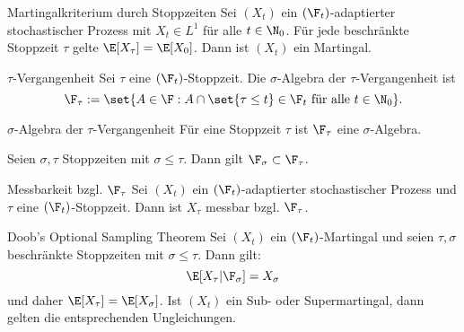 \begin{karte}{Martingalkriterium durch Stoppzeiten}
Sei \((X_t)\) ein \((\F_t)\)-adaptierter stochastischer Prozess mit \(X_t \in L^1\) für 
alle \(t\in \N_0\). Für jede beschränkte Stoppzeit \(\tau\) gelte 
\(\E[X_\tau] = \E[X_0]\). Dann ist \((X_t)\) ein Martingal.
\end{karte}

\begin{karte}{\(\tau\)-Vergangenheit}
Sei \(\tau\) eine \((\F_t)\)-Stoppzeit. Die \(\sigma\)-Algebra der \(\tau\)-Vergangenheit ist 
\[ \F_\tau := \set{ A\in \F: A \cap \set{\tau \leq t} \in \F_t \text{ für alle } t\in \N_0 }. \]
\end{karte}

\begin{karte}{\(\sigma\)-Algebra der \(\tau\)-Vergangenheit}
Für eine Stoppzeit \(\tau\) ist \(\F_\tau\) eine \(\sigma\)-Algebra. 

Seien \(\sigma, \tau\) Stoppzeiten mit \(\sigma \leq \tau\). Dann gilt \(\F_\sigma \subset \F_\tau\).
\end{karte}

\begin{karte}{Messbarkeit bzgl. \(\F_\tau\)}
Sei \((X_t)\) ein \((\F_t)\)-adaptierter stochastischer Prozess und \(\tau\) eine 
\((\F_t)\)-Stoppzeit. Dann ist \(X_\tau\) messbar bzgl. \(\F_\tau\).
\end{karte}

\begin{karte}{Doob's Optional Sampling Theorem}
Sei \((X_t)\) ein \((\F_t)\)-Martingal und seien \(\tau, \sigma\) beschränkte 
Stoppzeiten mit \(\sigma \leq \tau\). Dann gilt: 
\[ \E[X_\tau | \F_\sigma] = X_\sigma \]
und daher \(\E[X_\tau] = \E[X_\sigma]\). Ist \((X_t)\) ein Sub- oder 
Supermartingal, dann gelten die entsprechenden Ungleichungen.
\end{karte}